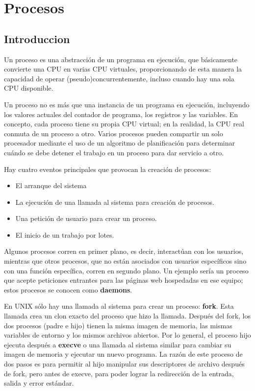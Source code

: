 \section{Procesos}
\subsection{Introduccion}

Un proceso es una abstracción de un programa en ejecución, que básicamente convierte una CPU en varias CPU virtuales, proporcionando de esta manera la capacidad de operar (pseudo)concurrentemente, incluso cuando hay una sola CPU disponible.

Un proceso no es más que una instancia de un programa en ejecución, incluyendo los valores actuales del contador de programa, los registros y las variables. En concepto, cada proceso tiene su propia CPU virtual; en la realidad, la CPU real conmuta de un proceso a otro. Varios procesos pueden compartir un solo procesador mediante el uso de un algoritmo de planificación para determinar cuándo se debe detener el trabajo en un proceso para dar servicio a otro.

Hay cuatro eventos principales que provocan la creación de procesos:
\begin{itemize}
\item El arranque del sistema
\item La ejecución de una llamada al sistema para creación de procesos.
\item Una petición de usuario para crear un proceso.
\item El inicio de un trabajo por lotes.
\end{itemize}

Algunos procesos corren en primer plano, es decir, interactúan con los usuarios, mientras que otros procesos, que no están asociados con usuarios específicos sino con una función específica, corren en segundo plano. Un ejemplo sería un proceso que acepte peticiones entrantes para las páginas web hospedadas en ese equipo; estos procesos se conocen como \textbf{daemons}.

En UNIX sólo hay una llamada al sistema para crear un proceso: \textbf{fork}. Esta llamada crea un clon exacto del proceso que hizo la llamada. Después del fork, los dos procesos (padre e hijo) tienen la misma imagen de memoria, las mismas variables de entorno y los mismos archivos abiertos. Por lo general, el proceso hijo ejecuta después a \textbf{execve} o una llamada al sistema similar para cambiar su imagen de memoria y ejecutar un nuevo programa. La razón de este proceso de dos pasos es para permitir al hijo manipular sus descriptores de archivo después de fork, pero antes de execve, para poder lograr la redirección de la entrada, salida y error estándar.


